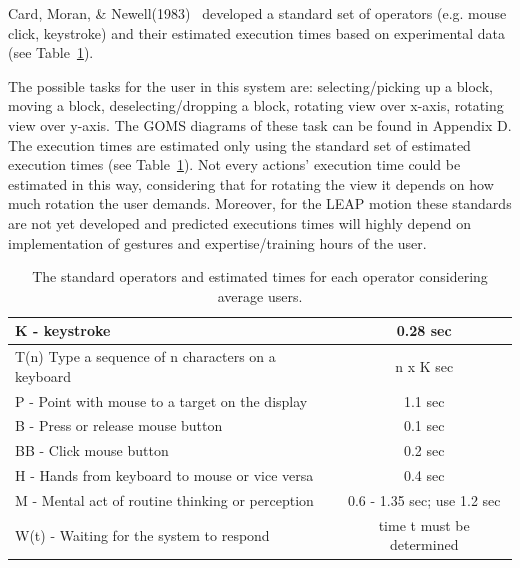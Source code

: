 Card, Moran, \& Newell(1983)~\cite{card1983psychology} developed a standard set of operators (e.g. mouse click, keystroke) and their estimated execution times based on experimental data (see Table~\ref{tab:standardops}). 

The possible tasks for the user in this system are: selecting/picking up a block, moving a block, deselecting/dropping a block, rotating view over x-axis, rotating view over y-axis. The GOMS diagrams of these task can be found in Appendix D. The execution times are estimated only using the standard set of estimated execution times (see Table~\ref{tab:standardops}). Not every actions' execution time could be estimated in this way, considering that for rotating the view it depends on how much rotation the user demands. Moreover, for the LEAP motion these standards are not yet developed and predicted executions times will highly depend on implementation of gestures and expertise/training hours of the user.


\begin{table}[H]
\centering
\begin{tabular}{|l|c|}
\hline
K - keystroke & 0.28 sec\\ \hline
T(n) Type a sequence of n characters on a keyboard & n x K sec \\ \hline
P - Point with mouse to a target on the display & 1.1 sec \\ \hline
B - Press or release mouse button & 0.1 sec \\ \hline
BB - Click mouse button & 0.2 sec \\ \hline
H - Hands from keyboard to mouse or vice versa & 0.4 sec \\  \hline
M - Mental act of routine thinking or perception & 0.6 - 1.35 sec; use 1.2 sec \\ \hline
W(t) - Waiting for the system to respond & time t must be determined \\ 
\hline
\end{tabular}
\caption{\label{tab:standardops} The standard operators and estimated times for each operator considering average users.}
\end{table}

